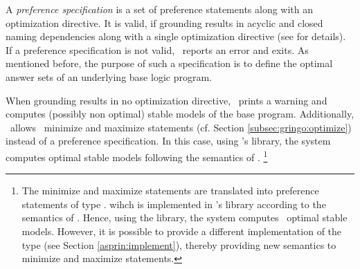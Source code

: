 A \emph{preference specification} is a set of preference statements along with an optimization directive.
It is valid, if grounding results in acyclic and closed naming dependencies
along with a single optimization directive
(see \cite{brderosc15a} for details).
If a preference specification is not valid, \asprin\ reports an error and exits.
%
As mentioned before,
the purpose of such a specification is to define the optimal answer sets of an underlying base logic program.
%
\begin{note}\label{asprin:noopt}
When grounding results in no optimization directive, 
\asprin\ prints a warning and computes (possibly non optimal) stable models of the base program.
%
Additionally, \asprin\ allows \clingo\ minimize and maximize statements 
(cf. Section \ref{subsec:gringo:optimize}) instead of a preference specification.
%
In this case, using \asprin's library, the system computes optimal stable models
following the semantics of \clingo.%
\footnote{%
The minimize and maximize statements 
are translated into preference statements of type .
wihch is implemented in \asprin's library according to the semantics of \clingo.
%
Hence, using the library, the system computes \clingo\ optimal stable models.
%
However, it is possible to provide a different implementation of the type  
(see Section \ref{asprin:implement}), 
thereby providing new semantics to minimize and maximize statements.}
\end{note}

